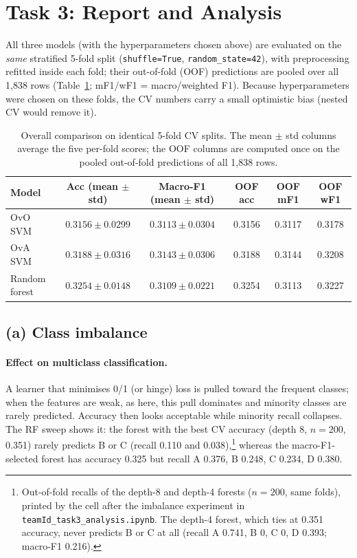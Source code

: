 \documentclass[11pt]{article}
\begin{document}
\section{Task 3: Report and Analysis}
All three models (with the hyperparameters chosen above) are evaluated on the \emph{same}
stratified 5-fold split (\texttt{shuffle=True}, \texttt{random\_state=42}), with preprocessing refitted inside each
fold; their out-of-fold (OOF) predictions are pooled over all 1{,}838 rows (Table~\ref{tab:overall}; mF1/wF1 = macro/weighted F1).
Because hyperparameters were chosen on these folds, the CV numbers carry a small optimistic bias (nested
CV would remove it).

\begin{table}[H]\centering\small
\caption{Overall comparison on identical 5-fold CV splits. The mean $\pm$ std columns average the five per-fold scores; the OOF columns are computed once on the pooled out-of-fold predictions of all 1{,}838 rows.}\label{tab:overall}
\setlength{\tabcolsep}{4pt}
\begin{tabular}{@{}lccccc@{}}
\toprule
Model & Acc (mean $\pm$ std) & Macro-F1 (mean $\pm$ std) & OOF acc & OOF mF1 & OOF wF1 \\
\midrule
OvO SVM & $0.3156\pm0.0299$ & $0.3113\pm0.0304$ & 0.3156 & 0.3117 & 0.3178 \\
OvA SVM & $0.3188\pm0.0316$ & $0.3143\pm0.0306$ & 0.3188 & 0.3144 & 0.3208 \\
Random forest & $0.3254\pm0.0148$ & $0.3109\pm0.0221$ & 0.3254 & 0.3113 & 0.3227 \\
\bottomrule
\end{tabular}
\end{table}

\subsection{(a) Class imbalance}\label{sec:t3a}
\paragraph{Effect on multiclass classification.} A learner that minimises 0/1 (or hinge) loss is pulled
toward the frequent classes; when the features are weak, as here, this pull dominates and minority
classes are rarely predicted. Accuracy then looks acceptable while minority recall collapses. The RF
sweep shows it: the forest with the best CV accuracy (depth 8, $n=200$, 0.351) rarely predicts B or C
(recall 0.110 and 0.038),\footnote{Out-of-fold recalls of the depth-8 and depth-4 forests ($n=200$, same
folds), printed by the cell after the imbalance experiment in \texttt{teamId\_task3\_analysis.ipynb}. The depth-4 forest, which ties at 0.351
accuracy, never predicts B or C at all (recall A 0.741, B 0, C 0, D 0.393; macro-F1 0.216).} whereas the macro-F1-selected forest has accuracy 0.325 but recall A 0.376,
B 0.248, C 0.234, D 0.380.
\end{document}
